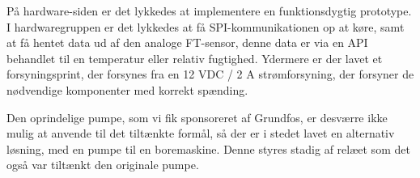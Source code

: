 
På hardware-siden er det lykkedes at implementere en funktionsdygtig prototype.
I hardwaregruppen er det lykkedes at få SPI-kommunikationen op at køre, samt at få hentet data ud af den analoge FT-sensor, denne data er via en API behandlet til en temperatur eller relativ fugtighed.
Ydermere er der lavet et forsyningsprint, der forsynes fra en 12 VDC / 2 A strømforsyning, der forsyner de nødvendige komponenter med korrekt spænding.

Den oprindelige pumpe, som vi fik sponsoreret af Grundfos, er desværre ikke mulig at anvende til det tiltænkte formål, så der er i stedet lavet en alternativ løsning, med en pumpe til en boremaskine. Denne styres stadig af relæet som det også var tiltænkt den originale pumpe. 

